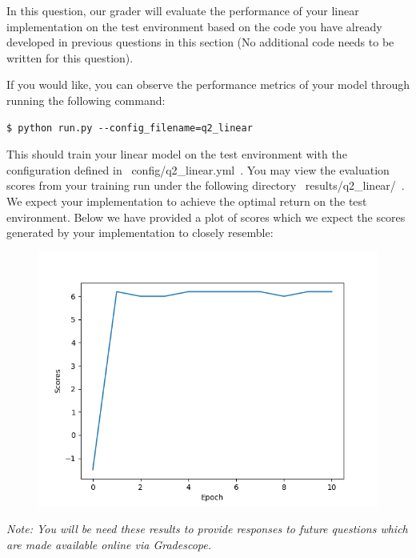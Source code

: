 \item {}

In this question, our grader will evaluate the performance of your linear implementation on the test environment based on the code you have already developed in previous questions in this section (No additional code needs to be written for this question).

If you would like, you can observe the performance metrics of your model through running the following command:

\begin{lstlisting}
$ python run.py --config_filename=q2_linear
\end{lstlisting}

This should train your linear model on the test environment with the configuration defined in ~config/q2_linear.yml~. You may view the evaluation scores from your training run under the following directory ~results/q2_linear/~. We expect your implementation to achieve the optimal return on the test environment. Below we have provided a plot of scores which we expect the scores generated by your implementation to closely resemble:

\begin{figure}[H]
\centering
  \includegraphics[width=.5\linewidth]{images/linear_test.png}
\end{figure}

\textit{Note: You will be need these results to provide responses to future questions which are made available online via Gradescope.}
\clearpage